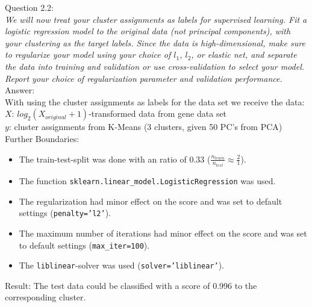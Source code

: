 
Question 2.2:\\	
\textsl{We will now treat your cluster assignments as labels for supervised learning. Fit a logistic regression model to the original data (not principal components), with your clustering as the target labels. Since the data is high-dimensional, make sure to regularize your model using your choice of $l_1$, $l_2$, or elastic net, and separate the data into training and validation or use cross-validation to select your model. Report your choice of regularization parameter and validation performance.}\\

Answer:\\
With using the cluster assignments as labels for the data set we receive the data:\\

$X$: $log_2(X_{original}+1)$-transformed data from gene data set\\
$y$: cluster assignments from K-Means (3 clusters, given 50 PC's from PCA)\\

Further Boundaries: 
\begin{itemize}
	\item The train-test-split was done with an ratio of 0.33 ($\frac{n_{train}}{{n_{test}}} \approx \frac{2}{1}$).
	\item The function \texttt{sklearn.linear\_model.LogisticRegression} was used.
	\item The regularization had minor effect on the score and was set to default settings (\texttt{penalty='l2'}).
	\item The maximum number of iterations had minor effect on the score and was set to default settings (\texttt{max\_iter=100}).
	\item The \texttt{liblinear}-solver was used (\texttt{solver='liblinear'}).
\end{itemize}

Result: The test data could be classified with a score of 0.996 to the corresponding cluster.